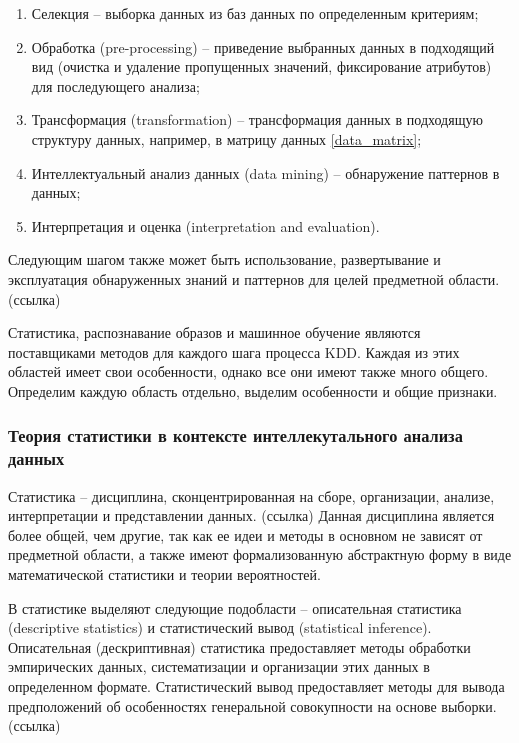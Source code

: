 \begin{enumerate}
    \item Селекция -- выборка данных из баз данных по определенным критериям;
    \item Обработка (pre-processing) -- приведение выбранных данных в подходящий вид 
    (очистка и удаление пропущенных значений, фиксирование атрибутов) для последующего анализа;
    \item Трансформация (transformation) -- трансформация данных в подходящую структуру данных, например, в матрицу данных \eqref{data_matrix};
    \item Интеллектуальный анализ данных (data mining) -- обнаружение паттернов в данных;
    \item Интерпретация и оценка (interpretation and evaluation).
\end{enumerate}

Следующим шагом также может быть использование, развертывание и эксплуатация обнаруженных знаний и паттернов для целей предметной области.
(ссылка)

Статистика, распознавание образов и машинное обучение являются поставщиками методов для каждого шага процесса KDD.
Каждая из этих областей имеет свои особенности, однако все они имеют также много общего.
Определим каждую область отдельно, выделим особенности и общие признаки.

\subsubsection{Теория статистики в контексте интеллекутального анализа данных}

Статистика -- дисциплина, сконцентрированная на сборе, организации, анализе, интерпретации и представлении данных. (ссылка)
Данная дисциплина является более общей, чем другие, так как ее идеи и методы в основном не зависят от предметной области,
а также имеют формализованную абстрактную форму в виде математической статистики и теории вероятностей.

В статистике выделяют следующие подобласти -- описательная статистика (descriptive statistics)
и статистический вывод (statistical inference).
Описательная (дескриптивная) статистика предоставляет методы обработки эмпирических данных,
систематизации и организации этих данных в определенном формате.
Статистический вывод предоставляет методы для вывода предположений об особенностях генеральной совокупности на основе выборки.
(ссылка)

